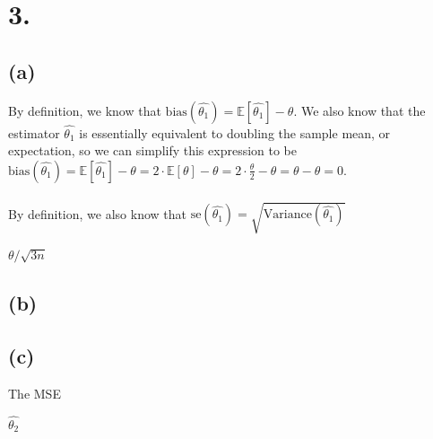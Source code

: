 \documentclass{article}
\begin{document}
\section*{3.}
{\Large

\subsection*{(a)}

By definition, we know that $\text{bias}(\hat{\theta_1}) = \mathbb{E}[\hat{\theta_1}] - \theta$. We also know that the estimator $\hat{\theta_1}$ is essentially equivalent to doubling the sample mean, or expectation, so we can simplify this expression to be \\
$\text{bias}(\hat{\theta_1}) = \mathbb{E}[\hat{\theta_1}] - \theta = 2 \cdot \mathbb{E}[\theta] - \theta = 2 \cdot \frac{\theta}{2} - \theta = \theta - \theta = 0.$ \\ \\
By definition, we also know that $\text{se}(\hat{\theta_1}) = \sqrt{\text{Variance}(\hat{\theta_1})}$

$\theta / \sqrt{3n}$

\subsection*{(b)}



\subsection*{(c)}

The MSE

$\hat{\theta_2}$

}
\end{document}

